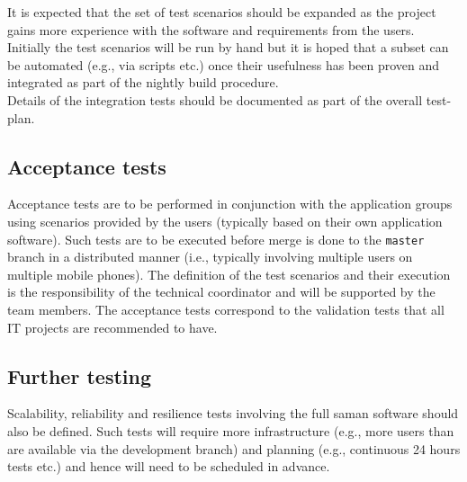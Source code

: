 \noindent It is expected that the set of test scenarios should be expanded as the project gains more experience with the software and requirements from the users.\\

\noindent Initially the test scenarios will be run by hand but it is hoped that a subset can be automated (e.g., via scripts etc.) once their usefulness has been proven and integrated as part of the nightly build procedure.\\

\noindent Details of the integration tests should be documented as part of the overall test-plan.

\subsection{Acceptance tests}

\noindent Acceptance tests are to be performed in conjunction with the application groups using scenarios provided by the users (typically based on their own application software). Such tests are to be executed before merge is done to the \texttt{master} branch in a distributed manner (i.e., typically involving multiple users on multiple mobile phones). The definition of the test scenarios and their execution is the responsibility of the technical coordinator and will be supported by the team members. The acceptance tests correspond to the validation tests that all IT projects are recommended to have.

\subsection{Further testing}

\noindent Scalability, reliability and resilience tests involving the full saman software should also be defined. Such tests will require more infrastructure (e.g., more users than are available via the development branch) and planning (e.g., continuous 24 hours tests etc.) and hence will need to be scheduled in advance.